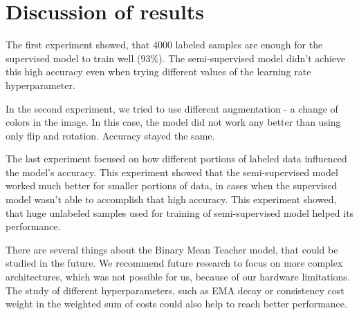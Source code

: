 \section{Discussion of results} 
The first experiment showed, that $4000$ labeled samples are enough for the supervised model to train well ($93\%$). The semi-supervised model didn't achieve this high accuracy even when trying different values of the learning rate hyperparameter.

In the second experiment, we tried to use different augmentation - a change of colors in the image. In this case, the model did not work any better than using only flip and rotation. Accuracy stayed the same.


The last experiment focused on how different portions of labeled data influenced the model's accuracy. This experiment showed that the semi-supervised model worked much better for smaller portions of data, in cases when the supervised model wasn't able to accomplish that high accuracy. This experiment showed, that huge unlabeled samples used for training of semi-supervised model helped its performance.

There are several things about the Binary Mean Teacher model, that could be studied in the future. We recommend future research to focus on more complex architectures, which was not possible for us, because of our hardware limitations. The study of different hyperparameters, such as EMA decay or consistency cost weight in the weighted sum of costs could also help to reach better performance.


